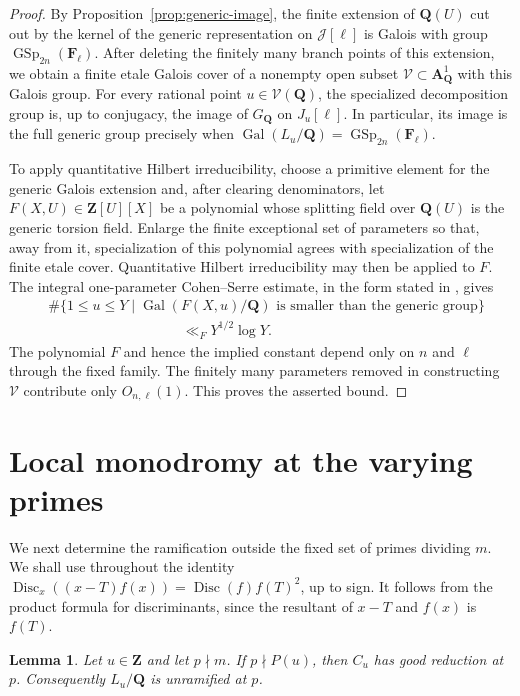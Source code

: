 \documentclass[11pt,hidelinks]{amsart}
\newtheorem{lemma}[theorem]{Lemma}
\newcommand{\Q}{\mathbf Q}
\newcommand{\Z}{\mathbf Z}
\newcommand{\F}{\mathbf F}
\newcommand{\Gal}{\operatorname{Gal}}
\newcommand{\GSp}{\operatorname{GSp}}
\newcommand{\Disc}{\operatorname{Disc}}
\begin{document}
\begin{proof}
By Proposition~\ref{prop:generic-image}, the finite extension of $\Q(U)$ cut out by
the kernel of the generic representation on $\mathcal J[\ell]$ is
Galois with group $\GSp_{2n}(\F_\ell)$.  After deleting the finitely
many branch points of this extension, we obtain a finite etale Galois
cover of a nonempty open subset $\mathcal V\subset\mathbf A^1_\Q$ with
this Galois group.  For every rational point $u\in\mathcal V(\Q)$, the
specialized decomposition group is, up to conjugacy, the image of
$G_\Q$ on $J_u[\ell]$.  In particular, its image is the full generic
group precisely when $\Gal(L_u/\Q)=\GSp_{2n}(\F_\ell)$.

To apply quantitative Hilbert irreducibility, choose a primitive element
for the generic Galois extension and, after clearing denominators, let
$F(X,U)\in\Z[U][X]$ be a polynomial whose splitting field over $\Q(U)$
is the generic torsion field.  Enlarge the finite exceptional set of parameters so
that, away from it, specialization of this polynomial agrees with
specialization of the finite etale cover.  Quantitative Hilbert
irreducibility may then be applied to $F$.  The integral one-parameter
Cohen--Serre estimate, in the form stated in
\cite[Theorem 1.2]{Zywina2010}, gives
\begin{align*}
&\#\{1\leq u\leq Y\mid\Gal(F(X,u)/\Q)
       \text{ is smaller than the generic group}\}\\
&\hspace{4cm}\ll_{F}Y^{1/2}\log Y.
\end{align*}
The polynomial $F$ and hence the implied constant depend only on
$n$ and $\ell$ through the fixed family.  The finitely many parameters
removed in constructing $\mathcal V$ contribute only $O_{n,\ell}(1)$.
This proves the asserted bound.
\end{proof}

\section{Local monodromy at the varying primes}\label{sec:local}

We next determine the ramification outside the fixed set of primes dividing $m$. We shall use throughout the identity $\Disc_x((x-T)f(x))=\Disc(f)f(T)^2$, up to sign. It follows from the product formula for discriminants, since the resultant of $x-T$ and $f(x)$ is $f(T)$.

\begin{lemma}\label{lem:good-reduction}
Let $u\in\Z$ and let $p\nmid m$. If $p\nmid P(u)$, then $C_u$ has good reduction at $p$. Consequently $L_u/\Q$ is unramified at $p$.
\end{lemma}
\end{document}
